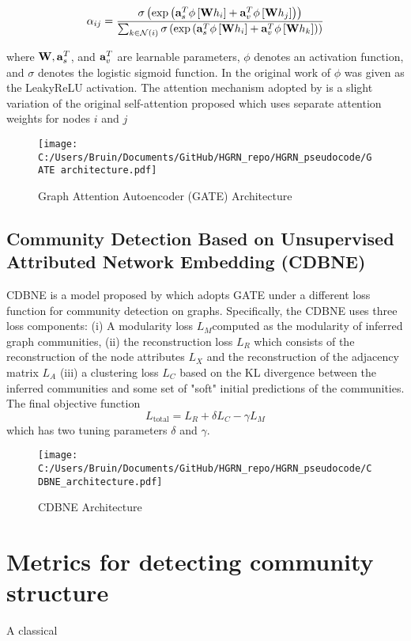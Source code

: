 \documentclass[a4paper,12pt]{article}
\begin{document}
	\[ \alpha_{ij} = \frac{\sigma\left(\exp\left({\bf a}_s^T\phi\left[{\bf W}h_i\right]+{\bf a}_v^T\phi\left[{\bf W}h_j \right]\right)\right)}
	{\sum_{k\in \mathcal{N}(i)}\sigma\left(\exp\left({\bf a}_s^T\phi\left[{\bf W}h_i\right]+{\bf a}_v^T\phi\left[{\bf W}h_k \right]\right)\right)} \]
	
	where ${\bf W},{\bf a}_s^T$, and ${\bf a}_v^T$ are learnable parameters, $\phi$ denotes an activation function, and $\sigma$ denotes the logistic sigmoid function. In the original work of \cite{velivckovic2017graph} $\phi$ was given as the LeakyReLU activation. The attention mechanism adopted by \cite{salehi2019graph} is a slight variation of the original self-attention proposed \cite{velivckovic2017graph} which uses separate attention weights for nodes $i$ and $j$ 
	
	\begin{figure}[H]
		\centering
		\caption{Graph Attention Autoencoder (GATE) Architecture}
		\texttt{[image: C:/Users/Bruin/Documents/GitHub/HGRN\_repo/HGRN\_pseudocode/GATE architecture.pdf]}
		\label{fig:gate}
	\end{figure}
	
	
	\subsection{Community Detection Based on Unsupervised Attributed Network Embedding (CDBNE)}
	
	CDBNE is a model proposed by \cite{zhou2023community} which adopts GATE under a different loss function for community detection on graphs. Specifically, the CDBNE uses three loss components: (i) A modularity loss $L_M$computed as the modularity of inferred graph communities, (ii) the reconstruction loss $L_R$ which consists of the reconstruction of the node attributes $L_X$ and the reconstruction of the adjacency matrix $L_A$ (iii) a clustering loss $L_C$ based on the KL divergence between the inferred communities and some set of "soft" initial predictions of the communities. The final objective function
	\[ L_{\text{total}} = L_R+\delta L_C-\gamma L_M \]
	which has two tuning parameters $\delta$ and $\gamma$.
	\begin{figure}[H]
		\centering
		\caption{CDBNE Architecture}
		\texttt{[image: C:/Users/Bruin/Documents/GitHub/HGRN\_repo/HGRN\_pseudocode/CDBNE\_architecture.pdf]}
		\label{fig:gae}
	\end{figure}
	
	
	
	
	\section{Metrics for detecting community structure}
	A classical 
	
\end{document}
